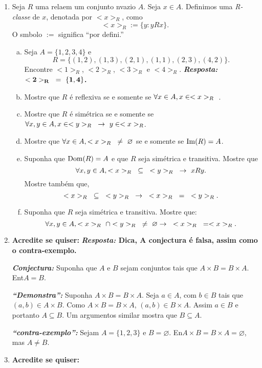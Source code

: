 \begin{enumerate}[{\bf 1.}]
\item Seja $R$ uma rela\cao em um conjunto n\ao vazio $A$. Seja $x\in A$. Definimos uma {\it R-classe} de $x$, denotada por $<x>_R$, como
\[
<x>_R:=\{y:yRx\}.
\]
O s\ih mbolo $:=$ significa ``por defini\caoi.''
\begin{enumerate}[a)]
\item Seja $A=\{1,2,3,4\}$ e
\[
R=\{(1,2), (1,3), (2,1), (1,1), (2,3), (4,2)\}.
\] 
Encontre $<1>_R$, $<2>_R$, $<3>_R$ e $<4>_R$. {\bf{\it Resposta:} ${\bf <2>_R\textrm{ }=\textrm{ } \{1,4\}}$.}
\item Mostre que $R$ \'e reflexiva se e somente se $\forall x\in A, x\in <x>_R\textrm{ }$. 
\item Mostre que $R$ \'e sim\'etrica se e somente se $\forall x,y\in A, x\in <y>_R\textrm{ }\to\textrm{ } y\in <x>_R$.
\item Mostre que $\forall x\in A, <x>_R\textrm{ }\neq\textrm{ }\varnothing$ se e somente se $\operatorname{Im}(R)=A$.
\item Suponha que $\operatorname{Dom}(R)=A$ e que $R$ seja sim\'etrica e transitiva. Mostre que
\[
\forall x,y\in A, <x>_R\textrm{ }\subseteq\textrm{ }<y>_R\textrm{ }\to\textrm{ } xRy.
\]
Mostre tamb\'em que,
\[
<x>_R\textrm{ }\subseteq\textrm{ }<y>_R\textrm{ }\to\textrm{ } <x>_R\textrm{ }=\textrm{ }<y>_R.
\]
\item Suponha que $R$ seja sim\'etrica e transitiva. Mostre que:
\[
\forall x,y\in A, <x>_R\textrm{ }\cap <y>_R\textrm{ }\neq\textrm{ }\varnothing\to\textrm{ } <x>_R\textrm{ }=<x>_R.
\]
\end{enumerate}

\item {\bf Acredite se quiser:}  {\bf{\it Resposta:} Dica, A conjectura \'e falsa, assim como o contra-exemplo.}

\noindent \textit{\textbf{Conjectura:}} Suponha que $A$ e $B$ sejam conjuntos tais que $A\times B=B\times A$. Ent\ao $A=B$.

\noindent \textit{\textbf{``Demonstra\caoi'':}} Suponha $A\times B=B\times A$. Seja $a\in A$, com $b\in B$ tais que $(a,b)\in A\times B$. Como $A\times B=B\times A$, $(a,b)\in B\times A$. Assim $a\in B$ e portanto $A\subseteq B$. Um argumentos similar mostra que $B\subseteq A$.

\noindent \textit{\textbf{``contra-exemplo'':}} Sejam $A=\{1,2,3\}$ e $B=\varnothing$. En\tao $A\times B=B\times A=\varnothing$, mas $A\neq B$. 

\item {\bf Acredite se quiser:}  


\end{enumerate}
